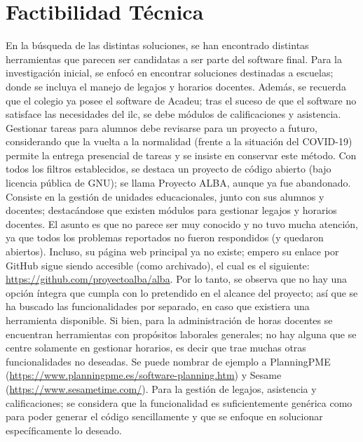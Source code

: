 \section{Factibilidad Técnica}
\normalsize{ \indent
En la búsqueda de las distintas soluciones,
se han encontrado distintas herramientas que
parecen ser candidatas a ser parte del software
final. Para la investigación inicial, se enfocó
en encontrar soluciones destinadas a escuelas;
donde se incluya el manejo de legajos y horarios
docentes. Además, se recuerda que el colegio ya
posee el software de Acadeu; tras el suceso de que
el software no satisface las necesidades del
\acrlong{ilc}, se debe módulos de calificaciones y
asistencia. Gestionar tareas para alumnos debe 
revisarse para un proyecto a futuro, considerando
que la vuelta a la normalidad (frente a la situación
del COVID-19) permite la entrega presencial de
tareas y se insiste en conservar este método.
}
\newline
\normalsize{ \indent
Con todos los filtros establecidos, se destaca un
proyecto de código abierto (bajo licencia pública de
GNU); se llama Proyecto ALBA, aunque ya fue abandonado.
Consiste en la gestión de unidades educacionales, junto
con sus alumnos y docentes; destacándose que existen
módulos para gestionar legajos y horarios docentes. El
asunto es que no parece ser muy conocido y no tuvo mucha
atención, ya que todos los problemas reportados no fueron
respondidos (y quedaron abiertos). Incluso, su página web
principal ya no existe; empero su enlace por GitHub sigue
siendo accesible (como archivado), el cual es el siguiente:
\url{https://github.com/proyectoalba/alba}.
}
\newline
\normalsize{ \indent
Por lo tanto, se observa que no hay una opción íntegra
que cumpla con lo pretendido en el alcance del proyecto;
así que se ha buscado las funcionalidades por separado, en
caso que existiera una herramienta disponible. Si bien, para
la administración de horas docentes se encuentran herramientas
con propósitos laborales generales; no hay alguna que se centre
solamente en gestionar horarios, es decir que trae muchas otras
funcionalidades no deseadas. Se puede nombrar de ejemplo a
PlanningPME
(\url{https://www.planningpme.es/software-planning.htm})
y Sesame (\url{https://www.sesametime.com/}). Para la
gestión de legajos, asistencia y calificaciones; se considera
que la funcionalidad es suficientemente genérica como para
poder generar el código sencillamente y que se enfoque en
solucionar específicamente lo deseado.
}
